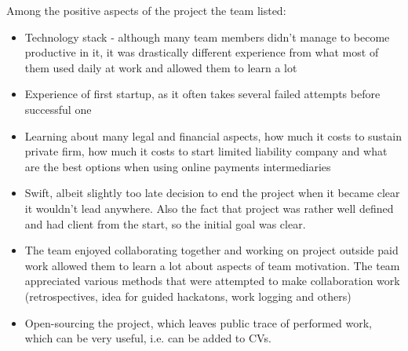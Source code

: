 \documentclass{article}
\begin{document}
Among the positive aspects of the project the team listed:
\begin{itemize}
\item Technology stack - although many team members didn't manage to become productive in it, it was drastically different experience from what most of them used daily at work and allowed them to learn a lot
\item Experience of first startup, as it often takes several failed attempts before successful one
\item Learning about many legal and financial aspects, how much it costs to sustain private firm, how much it costs to start limited liability company and what are the best options when using online payments intermediaries
\item Swift, albeit slightly too late decision to end the project when it became clear it wouldn't lead anywhere. Also the fact that project was rather well defined and had client from the start, so the initial goal was clear.
\item The team enjoyed collaborating together and working on project outside paid work allowed them to learn a lot about aspects of team motivation. The team appreciated various methods that were attempted to make collaboration work (retrospectives, idea for guided hackatons, work logging and others)
\item Open-sourcing the project, which leaves public trace of performed work, which can be very useful, i.e. can be added to CVs.
\end{itemize}
\end{document}
